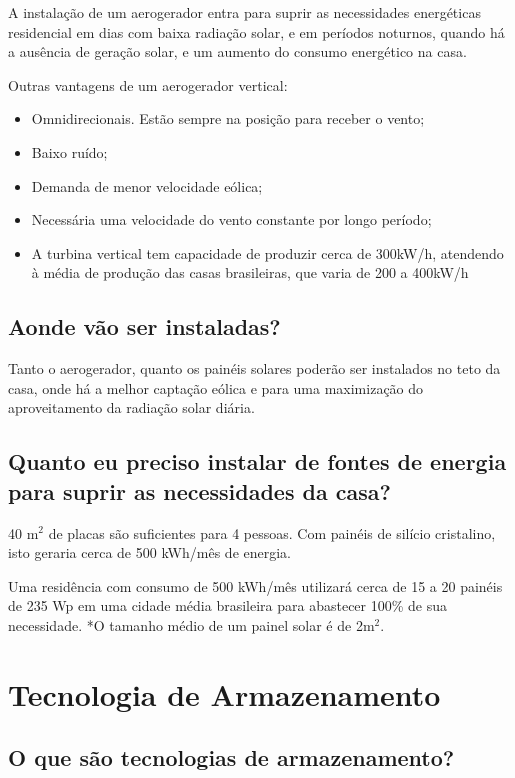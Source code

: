 	A instalação de um aerogerador entra para suprir as necessidades energéticas residencial em dias com baixa radiação solar, e em períodos noturnos, quando há a ausência de geração solar, e um aumento do consumo energético na casa.\cite{energygovplanning}\cite{globoaerogeradores}

	Outras vantagens de um aerogerador vertical: 
	\begin{itemize}
		\item Omnidirecionais. Estão sempre na posição para receber o vento;
		\item Baixo ruído;
		\item Demanda de menor velocidade eólica;
		\item Necessária uma velocidade do vento constante por longo período;
		\item A turbina vertical tem capacidade de produzir cerca de 300kW/h, atendendo à média de produção das casas brasileiras, que varia de 200 a 400kW/h
	\end{itemize}

\subsection{Aonde vão ser instaladas?}

	Tanto o aerogerador, quanto os painéis solares poderão ser instalados no teto da casa, onde há a melhor captação eólica e para uma maximização do aproveitamento da radiação solar diária. 
	
\subsection{Quanto eu preciso instalar de fontes de energia para suprir as necessidades da casa?}

	40 m$^{2}$ de placas são suficientes para 4 pessoas. Com painéis de silício cristalino, isto geraria cerca de 500 kWh/mês de energia.

	Uma residência com consumo de 500 kWh/mês utilizará cerca de 15 a 20 painéis de 235 Wp em uma cidade média brasileira para abastecer 100\% de sua necessidade. *O tamanho médio de um painel solar é de 2m$^{2}$. 

\section{Tecnologia de Armazenamento}
\subsection{O que são tecnologias de armazenamento?}

